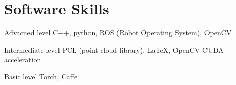 \documentclass{tccv}
\begin{document}
\section{Software Skills}
\begin{factlist}

\item{Advacned  level}
     {C++, python, ROS (Robot Operating System), OpenCV}

\item{Intermediate level}
     {PCL (point cloud library), \LaTeX, OpenCV CUDA acceleration}

\item{Basic level}
     {Torch, Caffe}

\end{factlist}
\end{document}
